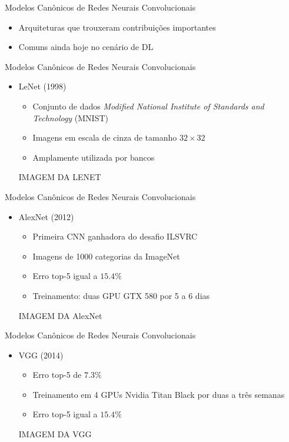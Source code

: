 \begin{frame}{Modelos Canônicos de Redes Neurais Convolucionais}
   \ \  \\[0.1cm]
   \begin{itemize}
     \item Arquiteturas que trouxeram contribuições importantes
     \item Comuns ainda hoje no cenário de DL
   \end{itemize}
\end{frame}

\begin{frame}{Modelos Canônicos de Redes Neurais Convolucionais}
   \ \  \\[0.1cm]
   \begin{itemize}
     \item LeNet (1998)
     \begin{itemize}
       \item Conjunto de dados \emph{Modified National Institute of Standards and Technology} (MNIST)
       \item Imagens em escala de cinza de tamanho $32 \times 32$
       \item Amplamente utilizada por bancos
     \end{itemize}
     IMAGEM DA LENET
   \end{itemize}
\end{frame}

\begin{frame}{Modelos Canônicos de Redes Neurais Convolucionais}
   \ \  \\[0.1cm]
   \begin{itemize}
     \item AlexNet (2012)
     \begin{itemize}
       \item Primeira CNN ganhadora do desafio ILSVRC
       \item Imagens de 1000 categorias da ImageNet
       \item Erro top-5 igual a $15.4\%$
       \item Treinamento: duas GPU GTX 580 por 5 a 6 dias
     \end{itemize}
     IMAGEM DA AlexNet
   \end{itemize}
\end{frame}

\begin{frame}{Modelos Canônicos de Redes Neurais Convolucionais}
   \ \  \\[0.1cm]
   \begin{itemize}
     \item VGG (2014)
     \begin{itemize}
       \item Erro top-5 de $7.3\%$
       \item Treinamento em 4 GPUs Nvidia Titan Black por duas a três semanas
       \item Erro top-5 igual a $15.4\%$
     \end{itemize}
     IMAGEM DA VGG
   \end{itemize}
\end{frame}

